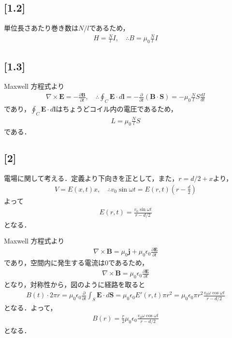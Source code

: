 \documentclass[12pt,dvipdfmx]{jsarticle}
\begin{document}
\subsection*{\large{[1.2]}}
単位長さあたり巻き数は$N/l$であるため，
\begin{eqnarray}
  H = \frac{N}{l}I,\quad\therefore B= \mu_0 \frac{N}{l}I
\end{eqnarray}
\subsection*{\large{[1.3]}}
Maxwell 方程式より
\begin{eqnarray}
  \nabla\times\bm{E} = -\frac{\partial \bm{B}}{\partial t},\quad\therefore \oint_C \bm{E}\cdot d\bm{l} = -\frac{\partial}{\partial t}\left( \bm{B}\cdot \bm{S} \right) = -\mu_0 \frac{N}{l}S \frac{dI}{dt}
\end{eqnarray}
であり，$\oint_C \bm{E}\cdot d\bm{l} $はちょうどコイル内の電圧であるため，
\begin{eqnarray}
  L = \mu_0 \frac{N}{l}S
\end{eqnarray}
である．
\subsection*{\large{[2]}}
電場に関して考える．定義より下向きを正として，また，$r=d/2+x$より，
\begin{eqnarray}
  V = E(x,t) x,\quad\therefore v_0\sin\omega t = E(r,t)\left( r-\frac{d}{2} \right)
\end{eqnarray}
よって
\begin{eqnarray}
  E(r,t) = \frac{v_0\sin\omega t}{r-d/2}
\end{eqnarray}
となる．

Maxwell 方程式より
\begin{eqnarray}
  \nabla\times \bm{B} = \mu_0 \bm{j} + \mu_0\epsilon_0 \frac{\partial \bm{E}}{\partial t}
\end{eqnarray}
であり，空間内に発生する電流は$0$であるため，
\begin{eqnarray}
  \nabla\times \bm{B} =   \mu_0\epsilon_0 \frac{\partial \bm{E}}{\partial t}
\end{eqnarray}
となり，対称性から，図のように経路を取ると
\begin{eqnarray}
  B(t)\cdot 2\pi r = \mu_0 \epsilon_0 \frac{\partial}{\partial t}\int_S \bm{E}\cdot d\bm{S} = \mu_0 \epsilon_0 E'(r,t) \pi r^2 =  \mu_0 \epsilon_0\pi r^2 \frac{v_0 \omega \cos\omega t}{r-d/2}
\end{eqnarray}
となる．よって，
\begin{eqnarray}
  B(r) = \frac{r}{2}\mu_0\epsilon_0 \frac{v_0\omega\cos\omega t}{r-d/2}
\end{eqnarray}
となる．
\end{document}
